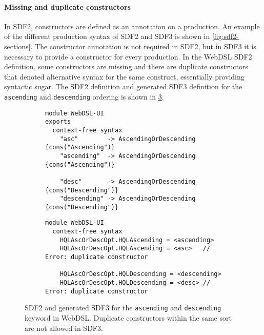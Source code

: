       \paragraph{Missing and duplicate constructors} In SDF2, constructors are defined as an annotation on a production. An example of the different production syntax of SDF2 and SDF3 is shown in \cref{fig:sdf2-sections}. The constructor annotation is not required in SDF2, but in SDF3 it is necessary to provide a constructor for every production. In the WebDSL SDF2 definition, some constructors are missing and there are duplicate constructors that denoted alternative syntax for the same construct, essentially providing syntactic sugar. The SDF2 definition and generated SDF3 definition for the \texttt{ascending} and \texttt{descending} ordering is shown in \cref{fig:sdf2-sdf3-asc-desc}.

      \begin{figure}
        \begin{subfigure}[b]{1\textwidth}
          \begin{verbatim}
module WebDSL-UI
exports
  context-free syntax
    "asc"        -> AscendingOrDescending {cons("Ascending")}
    "ascending"  -> AscendingOrDescending {cons("Ascending")}
    
    "desc"       -> AscendingOrDescending {cons("Descending")}
    "descending" -> AscendingOrDescending {cons("Descending")}
          \end{verbatim}
          \caption{\label{fig:sdf2-sdf3-asc-desc-sdf2}}
        \end{subfigure}
        \begin{subfigure}[b]{1\textwidth}
          \begin{verbatim}
module WebDSL-UI
  context-free syntax
    HQLAscOrDescOpt.HQLAscending = <ascending>
    HQLAscOrDescOpt.HQLAscending = <asc>   // Error: duplicate constructor

    HQLAscOrDescOpt.HQLDescending = <descending>
    HQLAscOrDescOpt.HQLDescending = <desc> // Error: duplicate constructor
          \end{verbatim}
          \caption{\label{fig:sdf2-sdf3-asc-desc-sdf3}}
        \end{subfigure}
        \caption{\label{fig:sdf2-sdf3-asc-desc}SDF2 and generated SDF3 for the \texttt{ascending} and \texttt{descending} keyword in WebDSL. Duplicate constructors within the same sort are not allowed in SDF3.}
      \end{figure}
      
